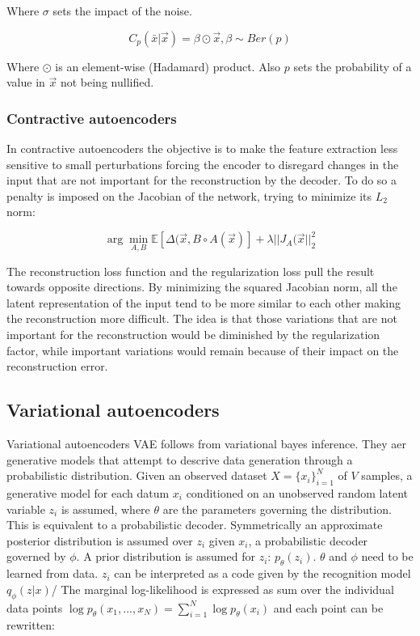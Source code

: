 		Where $\sigma$ sets the impact of the noise.

		$$C_p(\bar{x}|\vec{x}) = \beta\odot\vec{x}, \beta\sim Ber(p)$$

		Where $\odot$ is an element-wise (Hadamard) product.
		Also $p$ sets the probability of a value in $\vec{x}$ not being nullified.

		\subsubsection{Contractive autoencoders}
		In contractive autoencoders the objective is to make the feature extraction less sensitive to small perturbations forcing the encoder to disregard changes in the input that are not important for the reconstruction by the decoder.
		To do so a penalty is imposed on the Jacobian of the network, trying to minimize its $L_2$ norm:

		$$\arg\min\limits_{A,B}\mathbb{E}[\Delta(\vec{x}, B\circ A(\vec{x})] + \lambda||J_A(\vec{x}||_2^2$$

		The reconstruction loss function and the regularization loss pull the result towards opposite directions.
		By minimizing the squared Jacobian norm, all the latent representation of the input tend to be more similar to each other making the reconstruction more difficult.
		The idea is that those variations that are not important for the reconstruction would be diminished by the regularization factor, while important variations would remain because of their impact on the reconstruction error.

	\subsection{Variational autoencoders}
	Variational autoencoders VAE follows from variational bayes inference.
	They aer generative models that attempt to descrive data generation through a probabilistic distribution.
	Given an observed dataset $X=\{x_i\}^N_{i=1}$ of $V$ samples, a generative model for each datum $x_i$ conditioned on an unobserved random latent variable $z_i$ is assumed, where $\theta$ are the parameters governing the distribution.
	This is equivalent to a probabilistic decoder.
	Symmetrically an approximate posterior distribution is assumed over $z_i$ given $x_i$, a probabilistic decoder governed by $\phi$.
	A prior distribution is assumed for $z_i$: $p_\theta(z_i)$.
	$\theta$ and $\phi$ need to be learned from data.
	$z_i$ can be interpreted as a code given by the recognition model $q_\phi(z|x)$/
	The marginal log-likelihood is expressed as sum over the individual data points $\log p_\theta(x_1, \dots, x_N) = \sum\limits_{i=1}^N\log p_\theta(x_i)$ and each point can be rewritten:


